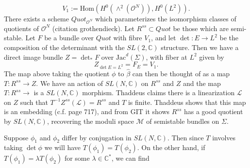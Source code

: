 \documentclass[]{article}
\newcommand{\C}{\mathbb{C}}
\newcommand{\Hom}{\text{Hom}}
\newcommand{\OO}{\mathcal{O}}
\newcommand{\LL}{\mathcal{L}}
\newcommand{\MM}{\mathcal{M}}
\begin{document}
	\begin{equation}
		V_1 := \Hom(H^0(\wedge^2(\OO^N)), H^0(L^2)).
	\end{equation}
	There exists a scheme $Quot_{\OO^N}$ which parameterizes the isomorphism classes of quotients of $\OO^N$ (citation grothendieck). Let $R^{ss}\subset Quot$ be those which are semi-stable. Let $F$ be a bundle over $Quot$ with fibre $V_1$, and let $\det:E\to L^2$ be the composition of the determinant with the $SL(2,\C)$ structure. Then we have a direct image bundle $Z = \det_\ast F$ over $\text{Jac}^d(\Sigma)$, with fiber at $L^2$ given by
	\begin{equation}
	Z_{\det E = L^2} = F_E = V_1.
	\end{equation}
	The map above taking the quotient $\phi$ to $\hat{\beta}$ can then be thought of as a map $T:R^{ss} \to Z$. We have an action of $SL(N,\C)$ on $R^{ss}$ and $Z$ and the map  $T:R^{ss}\to $ is a $SL(N,\C)$ morphism. Thaddeus claims there is a linearization $\LL$ on $Z$ such that $T^{-1}Z^{ss}(\LL) = R^{ss}$ and $T$ is finite. Thaddeus shows that this map is an embedding (c.f. page 717), and from GIT it shows $R^{ss}$ has a good quotient by $SL(N,\C)$, recovering the moduli space $\MM$ of semistable bundles on $\Sigma$.
	
	Suppose $\phi_1$ and $\phi_2$ differ by conjugation in $SL(N,\C)$. Then since $T$ involves taking $\det \phi$ we will have $T(\phi_1) = T(\phi_2)$. On the other hand, if $T(\phi_1) = \lambda T(\phi_2)$ for some $\lambda \in \C^\ast$, we can find 
	
\end{document}
